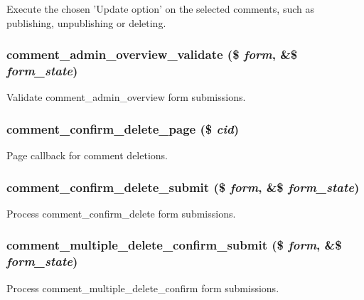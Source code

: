 Execute the chosen 'Update option' on the selected comments, such as publishing, unpublishing or deleting. \hypertarget{comment_8admin_8inc_a60a994bc18cf6f4a9a71a478700f973e}{
\subsubsection[{comment\_\-admin\_\-overview\_\-validate}]{\setlength{\rightskip}{0pt plus 5cm}comment\_\-admin\_\-overview\_\-validate (\$ {\em form}, \/  \&\$ {\em form\_\-state})}}
\label{comment_8admin_8inc_a60a994bc18cf6f4a9a71a478700f973e}
Validate comment\_\-admin\_\-overview form submissions. \hypertarget{comment_8admin_8inc_ae6452e8b6d18bd6ddaa006ceec5c7edf}{
\subsubsection[{comment\_\-confirm\_\-delete\_\-page}]{\setlength{\rightskip}{0pt plus 5cm}comment\_\-confirm\_\-delete\_\-page (\$ {\em cid})}}
\label{comment_8admin_8inc_ae6452e8b6d18bd6ddaa006ceec5c7edf}
Page callback for comment deletions. \hypertarget{comment_8admin_8inc_a4a91e7877e246726a22e875c215845bd}{
\subsubsection[{comment\_\-confirm\_\-delete\_\-submit}]{\setlength{\rightskip}{0pt plus 5cm}comment\_\-confirm\_\-delete\_\-submit (\$ {\em form}, \/  \&\$ {\em form\_\-state})}}
\label{comment_8admin_8inc_a4a91e7877e246726a22e875c215845bd}
Process comment\_\-confirm\_\-delete form submissions. \hypertarget{comment_8admin_8inc_a0995d69b00481eb46c1981112df0999f}{
\subsubsection[{comment\_\-multiple\_\-delete\_\-confirm\_\-submit}]{\setlength{\rightskip}{0pt plus 5cm}comment\_\-multiple\_\-delete\_\-confirm\_\-submit (\$ {\em form}, \/  \&\$ {\em form\_\-state})}}
\label{comment_8admin_8inc_a0995d69b00481eb46c1981112df0999f}
Process comment\_\-multiple\_\-delete\_\-confirm form submissions. 